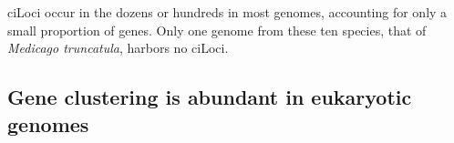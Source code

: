 ciLoci occur in the dozens or hundreds in most genomes, accounting for only a small proportion of genes.
Only one genome from these ten species, that of \textit{Medicago truncatula}, harbors no ciLoci.

%

\subsection*{Gene clustering is abundant in eukaryotic genomes}

